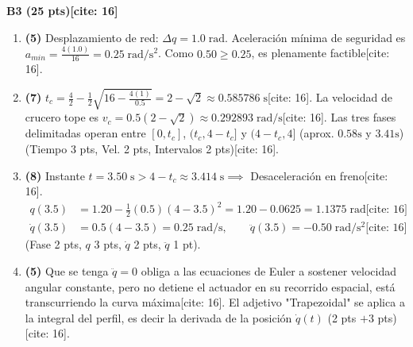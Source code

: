 \documentclass[11pt, a4paper]{article}
\begin{document}
\textbf{B3 (25 pts)[cite: 16]}
\begin{enumerate}\footnotesize
    \item \textbf{(5)} Desplazamiento de red: $\Delta q = 1.0\;\mathrm{rad}$. Aceleración mínima de seguridad es $a_{min} = \frac{4(1.0)}{16} = 0.25\;\mathrm{rad/s^2}$. Como $0.50 \ge 0.25$, es plenamente factible[cite: 16].
    \item \textbf{(7)} $t_c = \frac{4}{2} - \frac{1}{2}\sqrt{16 - \frac{4(1)}{0.5}} = 2 - \sqrt{2} \approx 0.585786\;\mathrm{s}$[cite: 16]. La velocidad de crucero tope es $v_c = 0.5(2-\sqrt{2}) \approx 0.292893\;\mathrm{rad/s}$[cite: 16]. Las tres fases delimitadas operan entre $[0, t_c]$, $(t_c, 4-t_c]$ y $(4-t_c, 4]$ (aprox. $0.58\mathrm{s}$ y $3.41\mathrm{s}$) (Tiempo 3 pts, Vel. 2 pts, Intervalos 2 pts)[cite: 16].
    \item \textbf{(8)} Instante $t = 3.50\;\mathrm{s} > 4 - t_c \approx 3.414\;\mathrm{s} \implies$ Desaceleración en freno[cite: 16].
    \begin{align*}
        q(3.5) &= 1.20 - \frac{1}{2}(0.5)(4 - 3.5)^2 = 1.20 - 0.0625 = 1.1375\;\mathrm{rad} \text{[cite: 16]} \\
        \dot{q}(3.5) &= 0.5(4 - 3.5) = 0.25\;\mathrm{rad/s}, \qquad \ddot{q}(3.5) = -0.50\;\mathrm{rad/s^2} \text{[cite: 16]}
    \end{align*}
    (Fase 2 pts, $q$ 3 pts, $\dot{q}$ 2 pts, $\ddot{q}$ 1 pt).
    \item \textbf{(5)} Que se tenga $\ddot{q} = 0$ obliga a las ecuaciones de Euler a sostener velocidad angular constante, pero no detiene el actuador en su recorrido espacial, está transcurriendo la curva máxima[cite: 16]. El adjetivo "Trapezoidal" se aplica a la integral del perfil, es decir la derivada de la posición $\dot{q}(t)$ (2 pts $+ 3$ pts)[cite: 16].
\end{enumerate}
\end{document}

